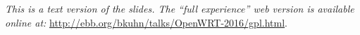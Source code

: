 \begin{center}
\textit{
This is a text version of the slides. The ``full experience'' web version is available
online at:} \url{http://ebb.org/bkuhn/talks/OpenWRT-2016/gpl.html}.

\end{center}
